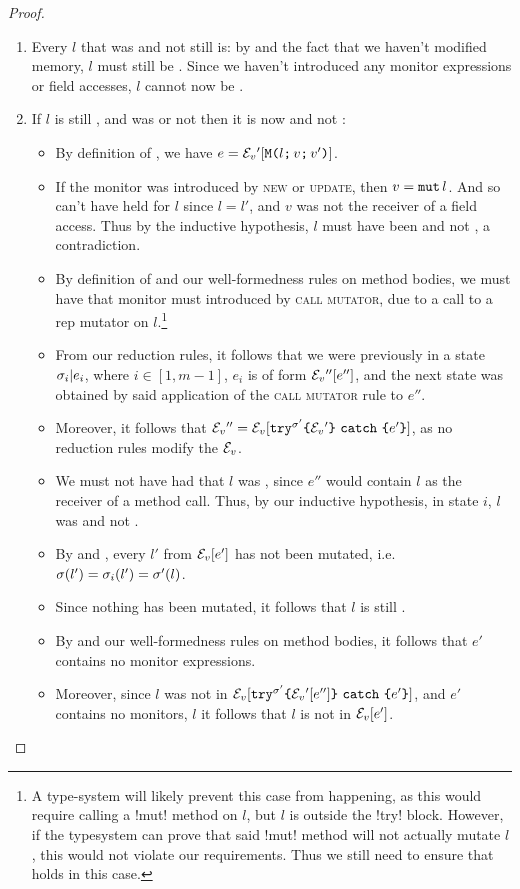\begin{proof}
\begin{ienumerate}
\begin{enumerate}
		\item Every \reach $l$ that was \RCN and not \RM still is: 
			by  and the fact that we haven't modified memory, $l$ must still be \RCN. Since we haven't introduced any monitor expressions or field accesses, $l$ cannot now be \RM.
		
		\item If $l$ is still \reach, and was \RM or not \RCN then it is now \RCN and not \RM:
		\begin{itemize}
			\item By definition of \error, we have $e = \mathcal{E}_v{}'[\texttt{M}\texttt{(}{}l\texttt{;}\,v\texttt{;}\,v'\texttt{)}]$.
			
			\item If the monitor was introduced by \textsc{new} or \textsc{update}, then $v = \texttt{mut}\,l$. And so \HNO can't have held for $l$ since $l = l'$, and $v$ was not the receiver of a field access.
			Thus by the inductive hypothesis, $l$ must have been \RCN and not \RM, a contradiction.
			\item By definition of \VS and our well-formedness rules on method bodies, we must have that monitor must introduced by \textsc{call mutator}, due to a call to a rep mutator on $l$.\footnote{
				A type-system will likely prevent this case from happening, 
				as this would require calling a \Q!mut! method on $l$, but $l$ is \reach outside the \Q!try! block. However, if the typesystem can prove that said \Q!mut! method will not actually mutate $l$, this would not violate our requirements.
				Thus we still need to ensure that  holds in this case.}
			\item From our reduction rules, it follows that we were previously in a state $\sigma_i|e_i$, where $i \in [1, m - 1]$, $e_i$ is of form $\mathcal{E}_v{}''[e'']$, and the next state was obtained by said application of the \textsc{call mutator} rule to $e''$.
			\item Moreover, it follows that $\mathcal{E}_v{}''= \mathcal{E}_v{}[\texttt{try}^{\sigma'}\texttt{\{}\mathcal{E}_v{}'\texttt{\}}\ \texttt{catch}\ \texttt{\{} e'\texttt{\}}]$, as no reduction rules modify the $\mathcal{E}_v{}$.
			\item We must not have had that $l$ was \HNO, since $e''$ would contain $l$ as the receiver of a method call. Thus, by our inductive hypothesis, in state $i$, $l$ was \RCN and not \RM.
		
			\item By  and , every $l'$ \reach from $\mathcal{E}_v{}[e']$ has not been mutated, i.e. $\sigma(l') = \sigma_i(l') = \sigma'(l)$.
			\item Since nothing \reach has been mutated, it follows that $l$ is still \RCN.
			\item By \VS and our well-formedness rules on method bodies, it follows that $e'$ contains no monitor expressions.
			\item Moreover, since $l$ was not \RM in $\mathcal{E}_v{}[\texttt{try}^{\sigma'}\texttt{\{}\mathcal{E}_v{}'[e'']\texttt{\}}\ \texttt{catch}\ \texttt{\{} e'\texttt{\}}]$, and $e'$ contains no monitors, $l$ it follows that $l$ is not \RM in $\mathcal{E}_v{}[e']$.
		\end{itemize}


\end{enumerate}
\end{ienumerate}
\end{proof}
